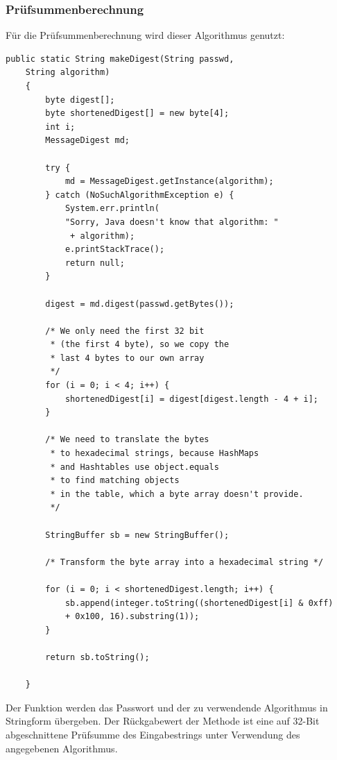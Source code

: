 \documentclass[11pt]{article}
\begin{document}
\subsubsection{Prüfsummenberechnung}
Für die Prüfsummenberechnung wird dieser Algorithmus genutzt: 
\begin{samepage}
\begin{lstlisting}[caption=Algorithmus zur Prüfsummenberechnung, label=lst:makeDigest]
    public static String makeDigest(String passwd, 
    String algorithm) 
    {
        byte digest[];
        byte shortenedDigest[] = new byte[4];
        int i;
        MessageDigest md;
        
        try {
            md = MessageDigest.getInstance(algorithm);
        } catch (NoSuchAlgorithmException e) {
            System.err.println(
            "Sorry, Java doesn't know that algorithm: "
             + algorithm);
            e.printStackTrace();
            return null;
        }
        
        digest = md.digest(passwd.getBytes());
        
        /* We only need the first 32 bit 
         * (the first 4 byte), so we copy the
         * last 4 bytes to our own array
         */
        for (i = 0; i < 4; i++) {
            shortenedDigest[i] = digest[digest.length - 4 + i];
        }
        
        /* We need to translate the bytes 
         * to hexadecimal strings, because HashMaps
         * and Hashtables use object.equals 
         * to find matching objects
         * in the table, which a byte array doesn't provide.
         */
         
        StringBuffer sb = new StringBuffer();
        
        /* Transform the byte array into a hexadecimal string */
        
        for (i = 0; i < shortenedDigest.length; i++) {
            sb.append(integer.toString((shortenedDigest[i] & 0xff) 
            + 0x100, 16).substring(1));
        }
        
        return sb.toString();

    }
\end{lstlisting}
\end{samepage}
Der Funktion werden das Passwort und der zu verwendende Algorithmus in Stringform übergeben.
Der Rückgabewert der Methode ist eine auf 32-Bit abgeschnittene Prüfsumme des Eingabestrings unter Verwendung des angegebenen Algorithmus.\\
\end{document}

